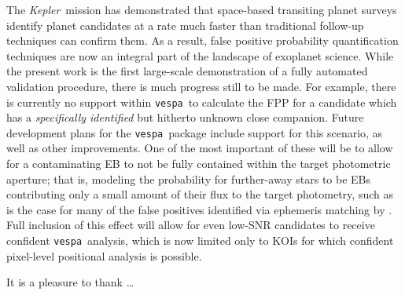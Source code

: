 \documentclass{emulateapj}
\newcommand{\kepler}{\textit{Kepler}}
\newcommand{\vespa}{\texttt{vespa}}
\begin{document}
The \kepler\ mission has demonstrated that space-based transiting
planet surveys identify planet candidates at a rate much faster than
traditional follow-up techniques can confirm them.  As a result, false
positive probability quantification techniques are now an integral
part of the landscape of exoplanet science.  While the present work is
the first large-scale demonstration of a fully automated validation
procedure, there is much progress still to be made.  For example,
there is currently no support within \vespa\ to calculate the FPP for
a candidate which has a \emph{specifically identified} but hitherto
unknown close companion.  Future development plans for the
\vespa\ package include support for this scenario, as well as other
improvements.  One of the most important of these will be to allow for
a contaminating EB to not be fully contained within the target
photometric aperture; that is, modeling the probability for
further-away stars to be EBs contributing only a small amount of their
flux to the target photometry, such as is the case for many of the
false positives identified via ephemeris matching by
\citet{Coughlin:2014}.  Full inclusion of this effect will allow for
even low-SNR candidates to receive confident \vespa\ analysis, which
is now limited only to KOIs for which confident pixel-level positional
analysis is possible.





\acknowledgments
It is a pleasure to thank
\ldots\

\clearpage

\clearpage
\end{document}
